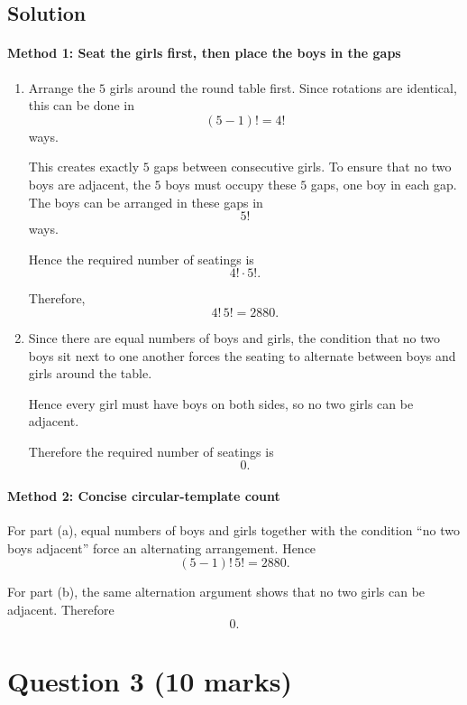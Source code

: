 \documentclass[12pt]{article}
\begin{document}
\subsection{Solution}

\paragraph{Method 1: Seat the girls first, then place the boys in the gaps}

\begin{enumerate}[label=(\alph*)]
    \item Arrange the $5$ girls around the round table first. Since rotations are identical, this can be done in
    \[
    (5-1)!=4!
    \]
    ways.

    This creates exactly $5$ gaps between consecutive girls. To ensure that no two boys are adjacent, the $5$ boys must occupy these $5$ gaps, one boy in each gap. The boys can be arranged in these gaps in
    \[
    5!
    \]
    ways.

    Hence the required number of seatings is
    \[
    4!\cdot 5!.
    \]

    Therefore,
    \[
    \boxed{4!\,5!=2880}.
    \]

    \item Since there are equal numbers of boys and girls, the condition that no two boys sit next to one another forces the seating to alternate between boys and girls around the table.

    Hence every girl must have boys on both sides, so no two girls can be adjacent.

    Therefore the required number of seatings is
    \[
    \boxed{0}.
    \]
\end{enumerate}

\paragraph{Method 2: Concise circular-template count}

For part (a), equal numbers of boys and girls together with the condition ``no two boys adjacent'' force an alternating arrangement. Hence
\[
\boxed{(5-1)!\,5!=2880}.
\]

For part (b), the same alternation argument shows that no two girls can be adjacent. Therefore
\[
\boxed{0}.
\]

\newpage
\section{Question 3 \hfill (10 marks)}
\end{document}
